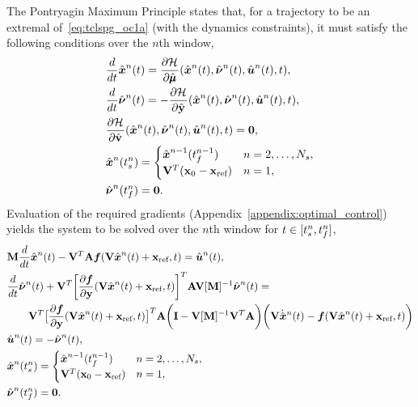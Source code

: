 The Pontryagin Maximum Principle states that, for a trajectory to be an extremal of~\eqref{eq:tclspg_oc1a} (with the dynamics constraints), it must satisfy the 
following conditions over the $n$th window,
\begin{align*}%
&\frac{d}{dt}\genstateArg{n}{t} = \frac{\partial \hamiltonianArg{}}{\partial \adjointDiscreteDumArgnt{}{}}(\genstateArg{n}{t},\adjointOCArg{n}{t},\controllerArg{n}{t},t),\\%
&\frac{d }{dt} \adjointOCArg{n}{t}= - \frac{\partial \hamiltonianArg{}}{\partial \genstateyDiscreteArgnt{}{}}(\genstateArg{n}{t},\adjointOCArg{n}{t},\controllerArg{n}{t},t),\\%
&\frac{\partial \hamiltonianArg{}}{\partial \controllerDiscreteDumArgnt{}{}} (\genstateArg{n}{t},\adjointOCArg{n}{t},\controllerArg{n}{t},t) = \boldsymbol 0, \\
& \genstateArg{n}{\timeStartArg{n}} =
\begin{cases} \genstate^{n-1}(\timeEndArg{n-1} ) & n = 2,\ldots,\nslabs,
 \\ \genstateIC & n=1,\end{cases} \\
&\adjointOCArg{n}{\timeEndArg{n}}= \bz.
\end{align*}
Evaluation of the required gradients (Appendix~\ref{appendix:optimal_control}) yields the system to be solved over the $n$th window for $t \in [\timeStartArg{n},\timeEndArg{n}]$,
\begin{align}\label{eq:sys_oc1}
&\mass \frac{d}{dt} \genstateArg{n}{t}  -  \basisspace^T \stweightingMatArgt{n}{t} \velocity(\veloargsromn) =  \controllerArg{n}{t} , \\
 &\frac{d}{dt} \adjointOCArg{n}{t}  + \basisspace^T \bigg[\frac{\partial \velocity}{\partial \stateyDiscrete} (\basisspace \genstateArg{n}{t} + \stateIntercept,t) \bigg]^T \stweightingMatArgt{n}{t} \basisspace [\massArgt{n}{t}]^{-1} \adjointOCArg{n}{t} = \nonumber \\
 & \qquad \basisspace^T \big[ \frac{\partial \velocity}{\partial \stateyDiscrete}(\basisspace \genstateArg{n}{t} + \stateIntercept,t) \big]^T \stweightingMatArgt{n}{t} \bigg( \mathbf{I} -   \basisspace [\massArgt{n}{t}]^{-1} \basisspace^T  \stweightingMatArgt{n}{t} \bigg)  \bigg( \basisspace \genstateDotArg{n}{t}  -   \velocity(\veloargsromn) \bigg) \label{eq:sys_oc2} \\
&\controllerArg{n}{t} = -\adjointOCArg{n}{t} \label{eq:sys_oc3}, \\
& \genstateArg{n}{\timeStartArg{n}} = 
\begin{cases}
 \genstate^{n-1}(\timeEndArg{n-1}) & n=2,\ldots,\nslabs, \\
\genstateIC & n=1,  
\end{cases} \label{eq:sys_oc4} \\
& \adjointOCArg{n}{\timeEndArg{n}} = \boldsymbol 0 \label{eq:sys_oc5}.
\end{align}
